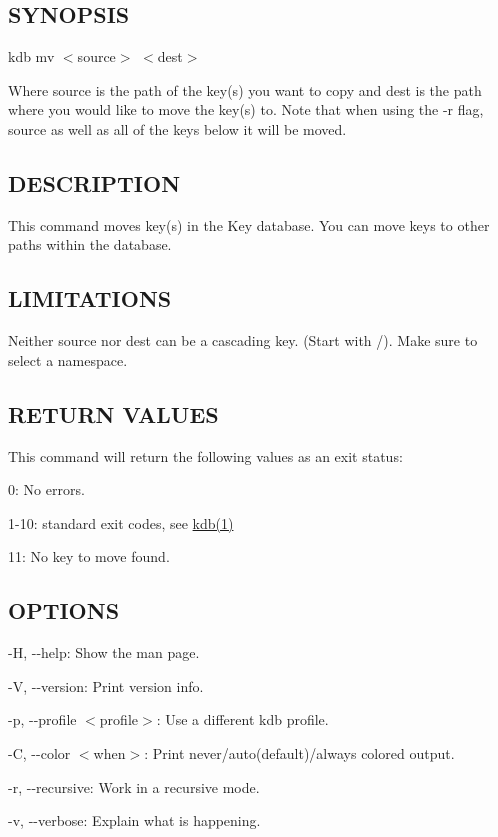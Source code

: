 \subsection*{S\+Y\+N\+O\+P\+S\+IS}

{\ttfamily kdb mv $<$source$>$ $<$dest$>$}

Where {\ttfamily source} is the path of the key(s) you want to copy and {\ttfamily dest} is the path where you would like to move the key(s) to. Note that when using the {\ttfamily -\/r} flag, {\ttfamily source} as well as all of the keys below it will be moved.

\subsection*{D\+E\+S\+C\+R\+I\+P\+T\+I\+ON}

This command moves key(s) in the Key database. You can move keys to other paths within the database.

\subsection*{L\+I\+M\+I\+T\+A\+T\+I\+O\+NS}

Neither {\ttfamily source} nor {\ttfamily dest} can be a cascading key. (Start with {\ttfamily /}). Make sure to select a namespace.

\subsection*{R\+E\+T\+U\+RN V\+A\+L\+U\+ES}

This command will return the following values as an exit status\+:


\begin{DoxyItemize}
\item 0\+: No errors.
\item 1-\/10\+: standard exit codes, see \hyperlink{doc_help_kdb_md}{kdb(1)}
\item 11\+: No key to move found.
\end{DoxyItemize}

\subsection*{O\+P\+T\+I\+O\+NS}


\begin{DoxyItemize}
\item {\ttfamily -\/H}, {\ttfamily -\/-\/help}\+: Show the man page.
\item {\ttfamily -\/V}, {\ttfamily -\/-\/version}\+: Print version info.
\item {\ttfamily -\/p}, {\ttfamily -\/-\/profile $<$profile$>$}\+: Use a different kdb profile.
\item {\ttfamily -\/C}, {\ttfamily -\/-\/color $<$when$>$}\+: Print never/auto(default)/always colored output.
\item {\ttfamily -\/r}, {\ttfamily -\/-\/recursive}\+: Work in a recursive mode.
\item {\ttfamily -\/v}, {\ttfamily -\/-\/verbose}\+: Explain what is happening.
\end{DoxyItemize}

